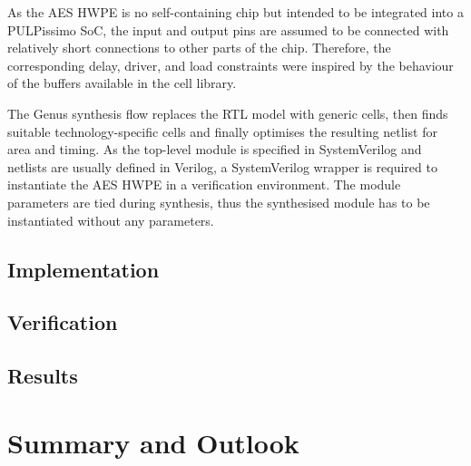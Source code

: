\documentclass[a4paper, 12pt]{article}
\begin{document}
As the AES HWPE is no self-containing chip but intended to be integrated into a PULPissimo SoC, the input and output pins are assumed to be connected with relatively short connections to other parts of the chip. Therefore, the corresponding delay, driver, and load constraints were inspired by the behaviour of the buffers available in the cell library.

The Genus synthesis flow replaces the RTL model with generic cells, then finds suitable technology-specific cells and finally optimises the resulting netlist for area and timing. As the top-level module is specified in SystemVerilog and netlists are usually defined in Verilog, a SystemVerilog wrapper is required to instantiate the AES HWPE in a verification environment. The module parameters are tied during synthesis, thus the synthesised module has to be instantiated without any parameters.

\subsection{Implementation} \label{sec:asic:impl}










\subsection{Verification} \label{sec:asic:verification}

\subsection{Results} \label{sec:asic:results}





\section{Summary and Outlook} \label{sec:summary}

\clearpage
\sloppy
\printbibliography
\end{document}
